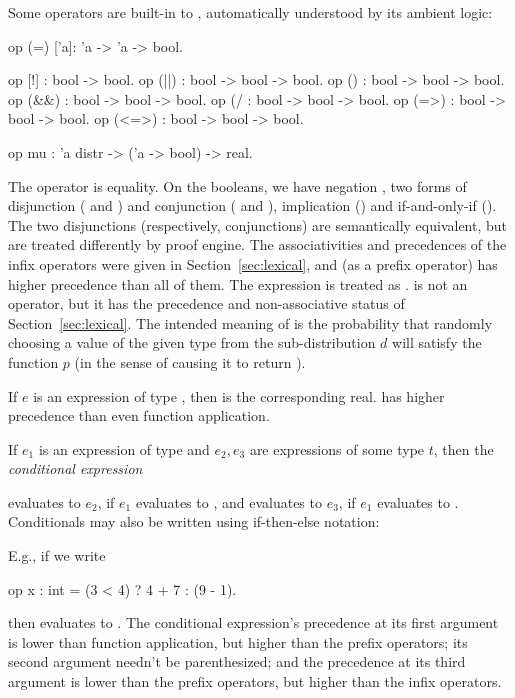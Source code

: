 Some operators are built-in to \EasyCrypt, automatically understood
by its ambient logic:
\begin{easycrypt}{}{}
op (=) ['a]: 'a -> 'a -> bool.

op [!] : bool -> bool.
op (||) : bool -> bool -> bool.
op (\/) : bool -> bool -> bool.
op (&&) : bool -> bool -> bool.
op (/\) : bool -> bool -> bool.
op (=>) : bool -> bool -> bool.
op (<=>) : bool -> bool -> bool.

op mu : 'a distr -> ('a -> bool) -> real.
\end{easycrypt}
The operator \ec{=} is equality. On the booleans, we have negation
\ec{!}, two forms of disjunction (\ec{\\/} and \ec{||}) and conjunction
(\ec{/\\} and \ec{&&}), implication (\ec{=>}) and if-and-only-if
(\ec{<=>}).  The two disjunctions (respectively, conjunctions) are
semantically equivalent, but are treated differently by \EasyCrypt
proof engine. The associativities and precedences of the infix
operators were given in Section~\ref{sec:lexical}, and (as a prefix
operator) \ec{!} has higher precedence than all of them. The
expression  is treated as . \ec{<>} is not an operator, but it has the precedence and
non-associative status of Section~\ref{sec:lexical}.
The intended meaning of  is the probability that
randomly choosing a value of the given type from the sub-distribution
$d$ will satisfy the function $p$ (in the sense of causing it to return
).

If $e$ is an expression of type , then
 is the corresponding real.  has higher precedence
than even function application.

If $e_1$ is an expression of type  and $e_2,e_3$ are expressions
of some type $t$, then the \emph{conditional expression}
\begin{center}
\end{center}
evaluates to $e_2$, if $e_1$ evaluates to , and evaluates to
$e_3$, if $e_1$ evaluates to .  Conditionals may also be
written using if-then-else notation:
\begin{center}
\end{center}
E.g., if we write
\begin{easycrypt}{}{}
op x : int = (3 < 4) ? 4 + 7 : (9 - 1).
\end{easycrypt}
then  evaluates to . The conditional expression's
precedence at its first argument is lower than function
application, but higher than the prefix operators; its second argument
needn't be parenthesized; and the precedence at its third argument is
lower than the prefix operators, but higher than the infix operators.

